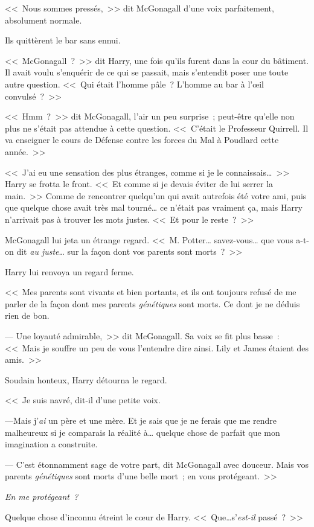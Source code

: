 <<~Nous sommes pressés,~>> dit McGonagall d'une voix parfaitement, absolument normale.

Ils quittèrent le bar sans ennui.

<<~McGonagall~?~>> dit Harry, une fois qu'ils furent dans la cour du bâtiment. Il avait voulu s'enquérir de ce qui se passait, mais s'entendit poser une toute autre question. <<~Qui était l'homme pâle~? L'homme au bar à l'\oe{}il convulsé~?~>>

<<~Hmm~?~>> dit McGonagall, l'air un peu surprise~; peut-être qu'elle non plus ne s'était pas attendue à cette question. <<~C'était le Professeur Quirrell. Il va enseigner le cours de Défense contre les forces du Mal à Poudlard cette année.~>>

<<~J'ai eu une sensation des plus étranges, comme si je le connaissais\ldots~>> Harry se frotta le front. <<~Et comme si je devais éviter de lui serrer la main.~>> Comme de rencontrer quelqu'un qui avait autrefois été votre ami, puis que quelque chose avait très mal tourné\ldots{} ce n'était pas vraiment ça, mais Harry n'arrivait pas à trouver les mots justes. <<~Et pour le reste~?~>>

McGonagall lui jeta un étrange regard. <<~M. Potter\ldots{} savez-vous\ldots{} que vous a-t-on dit \emph{au juste}\ldots{} sur la façon dont vos parents sont morts~?~>>

Harry lui renvoya un regard ferme.

<<~Mes parents sont vivants et bien portants, et ils ont toujours refusé de me parler de la façon dont mes parents \emph{génétiques} sont morts. Ce dont je ne déduis rien de bon.

--- Une loyauté admirable,~>> dit McGonagall. Sa voix se fit plus basse~: <<~Mais je souffre un peu de vous l'entendre dire ainsi. Lily et James étaient des amis.~>>

Soudain honteux, Harry détourna le regard.

<<~Je suis navré, dit-il d'une petite voix.

---Mais j'\emph{ai} un père et une mère. Et je sais que je ne ferais que me rendre malheureux si je comparais la réalité à\ldots{} quelque chose de parfait que mon imagination a construite.

--- C'est étonnamment sage de votre part, dit McGonagall avec douceur. Mais vos parents \emph{génétiques} sont morts d'une belle mort~; en vous protégeant.~>>

\emph{En me protégeant~?}

Quelque chose d'inconnu étreint le c\oe{}ur de Harry. <<~Que\ldots s'\emph{est-il} passé~?~>>

